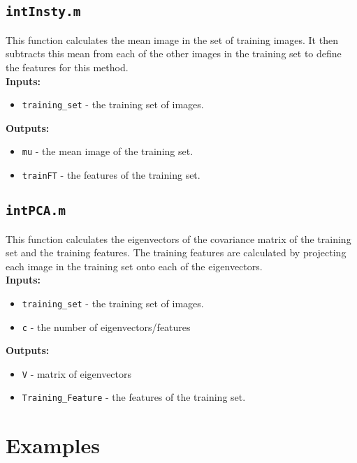 \documentclass[10pt]{article}
\begin{document}
\subsection{\tt intInsty.m} 
This function calculates the mean image in the set of training images. It then subtracts this mean from each of the other images in the training set to define the features for this method. \\ 

{\bf Inputs:} 
\begin{itemize}
\item {\tt training\_set} - the training set of images. 
\end{itemize}

{\bf Outputs:}
\begin{itemize}
\item {\tt mu} - the mean image of the training set.
\item {\tt trainFT} - the features of the training set. 
\end{itemize}

\subsection{\tt intPCA.m}
This function calculates the eigenvectors of the covariance matrix of the training set and the training features. The training features are calculated by projecting each image in the training set onto each of the eigenvectors. \\
 
{\bf Inputs:} 
\begin{itemize}
\item {\tt training\_set} - the training set of images.
\item {\tt c} - the number of eigenvectors/features
\end{itemize}

{\bf Outputs:}
\begin{itemize}
\item {\tt V} - matrix of eigenvectors 
\item {\tt Training\_Feature} - the features of the training set. 
\end{itemize}


\section{Examples}
\end{document}
